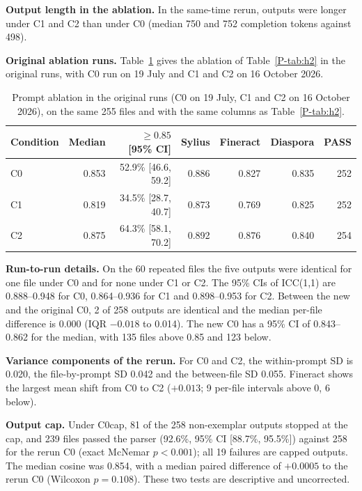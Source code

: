 \textbf{Output length in the ablation.} In the same-time rerun, outputs were longer under C1 and C2 than under C0 (median 750 and 752 completion tokens against 498).

\textbf{Original ablation runs.} Table~\ref{tab:h2orig} gives the ablation of Table~\ref{P-tab:h2} in the original runs, with C0 run on 19 July and C1 and C2 on 16 October 2026.

\begin{table}[H]
\centering
\caption{Prompt ablation in the original runs (C0 on 19 July, C1 and C2 on 16 October 2026), on the same 255 files and with the same columns as Table~\ref{P-tab:h2}.}
\label{tab:h2orig}
\setlength{\tabcolsep}{4pt}
\begin{tabular}{lrrrrrr}
\hline
Condition & Median & $\ge 0.85$ [95\% CI] & Sylius & Fineract & Diaspora & PASS\\
\hline
C0 & 0.853 & 52.9\% [46.6, 59.2] & 0.886 & 0.827 & 0.835 & 252\\
C1 & 0.819 & 34.5\% [28.7, 40.7] & 0.873 & 0.769 & 0.825 & 252\\
C2 & 0.875 & 64.3\% [58.1, 70.2] & 0.892 & 0.876 & 0.840 & 254\\
\hline
\end{tabular}
\end{table}

\textbf{Run-to-run details.} On the 60 repeated files the five outputs were identical for one file under C0 and for none under C1 or C2. The 95\% CIs of ICC(1,1) are 0.888--0.948 for C0, 0.864--0.936 for C1 and 0.898--0.953 for C2. Between the new and the original C0, 2 of 258 outputs are identical and the median per-file difference is 0.000 (IQR $-0.018$ to 0.014). The new C0 has a 95\% CI of 0.843--0.862 for the median, with 135 files above 0.85 and 123 below.

\textbf{Variance components of the rerun.} For C0 and C2, the within-prompt SD is 0.020, the file-by-prompt SD 0.042 and the between-file SD 0.055. Fineract shows the largest mean shift from C0 to C2 ($+0.013$; 9 per-file intervals above 0, 6 below).

\textbf{Output cap.} Under C0cap, 81 of the 258 non-exemplar outputs stopped at the cap, and 239 files passed the parser (92.6\%, 95\% CI [88.7\%, 95.5\%]) against 258 for the rerun C0 (exact McNemar $p < 0.001$); all 19 failures are capped outputs. The median cosine was 0.854, with a median paired difference of $+0.0005$ to the rerun C0 (Wilcoxon $p = 0.108$). These two tests are descriptive and uncorrected.

